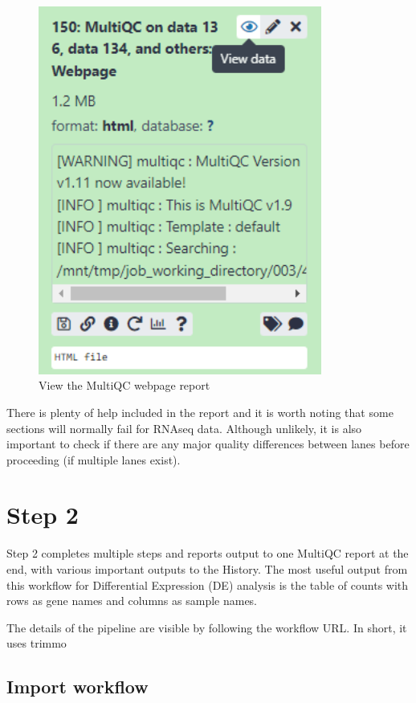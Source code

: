 \documentclass[
]{book}
\begin{document}
\begin{figure}

{\centering \includegraphics[width=3.67in]{images/image_view_multiQC} 

}

\caption{View the MultiQC webpage report}\label{fig:view-multiQC}
\end{figure}

There is plenty of help included in the report and it is worth noting that some sections will normally fail for RNAseq data. Although unlikely, it is also important to check if there are any major quality differences between lanes before proceeding (if multiple lanes exist).

\hypertarget{step-2}{%
\chapter{Step 2}\label{step-2}}

Step 2 completes multiple steps and reports output to one MultiQC report at the end, with various important outputs to the History.
The most useful output from this workflow for Differential Expression (DE) analysis is the table of counts with rows as gene names and columns as sample names.

The details of the pipeline are visible by following the workflow URL. In short, it uses trimmo

\hypertarget{import-workflow}{%
\section{Import workflow}\label{import-workflow}}
\end{document}
